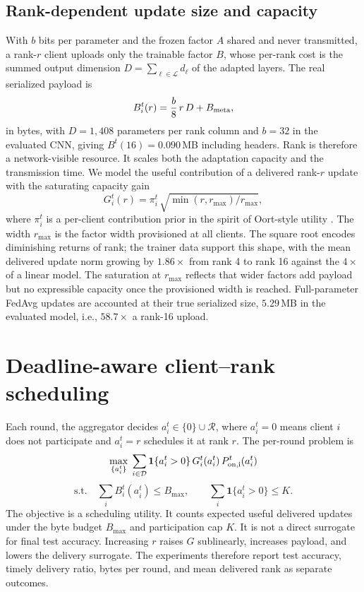 \documentclass[preprint,12pt]{elsarticle}
\begin{document}
\subsection{Rank-dependent update size and capacity}
With $b$ bits per parameter and the frozen factor $A$ shared and never transmitted, a rank-$r$ client uploads only the trainable factor $B$, whose per-rank cost is the summed output dimension $D=\sum_{\ell\in\mathcal L}d_\ell$ of the adapted layers. The real serialized payload is
\begin{equation}
B_i^t(r)=\frac{b}{8}\,r\,D+B_{\rm meta},
\label{eq:size}
\end{equation}
in bytes, with $D=1{,}408$ parameters per rank column and $b=32$ in the evaluated CNN, giving $B^t(16)=0.090$\,MB including headers. Rank is therefore a network-visible resource. It scales both the adaptation capacity and the transmission time. We model the useful contribution of a delivered rank-$r$ update with the saturating capacity gain
\begin{equation}
G_i^t(r)=\pi_i^t\,\sqrt{\min(r,r_{\max})/r_{\max}},
\label{eq:cap}
\end{equation}
where $\pi_i^t$ is a per-client contribution prior in the spirit of Oort-style utility \cite{oort2021oort}. The width $r_{\max}$ is the factor width provisioned at all clients. The square root encodes diminishing returns of rank; the trainer data support this shape, with the mean delivered update norm growing by $1.86\times$ from rank 4 to rank 16 against the $4\times$ of a linear model. The saturation at $r_{\max}$ reflects that wider factors add payload but no expressible capacity once the provisioned width is reached. Full-parameter FedAvg updates are accounted at their true serialized size, $5.29$\,MB in the evaluated model, i.e., $58.7\times$ a rank-16 upload.

\section{Deadline-aware client--rank scheduling}
\label{sec:problem}

Each round, the aggregator decides $a_i^t\in\{0\}\cup\mathcal R$, where $a_i^t=0$ means client $i$ does not participate and $a_i^t=r$ schedules it at rank $r$. The per-round problem is
\begin{equation}
\max_{\{a_i^t\}}\;\sum_{i\in\mathcal D}\mathbf 1\{a_i^t>0\}\,G_i^t(a_i^t)\,P_{\rm on,i}^t(a_i^t)
\label{eq:objective}
\end{equation}
\begin{equation}
\text{s.t.}\quad \sum_i B_i^t(a_i^t)\le B_{\max},\qquad \sum_i\mathbf 1\{a_i^t>0\}\le K .
\label{eq:constraints}
\end{equation}
The objective is a scheduling utility. It counts expected useful delivered updates under the byte budget $B_{\max}$ and participation cap $K$. It is not a direct surrogate for final test accuracy. Increasing $r$ raises $G$ sublinearly, increases payload, and lowers the delivery surrogate. The experiments therefore report test accuracy, timely delivery ratio, bytes per round, and mean delivered rank as separate outcomes.
\end{document}
